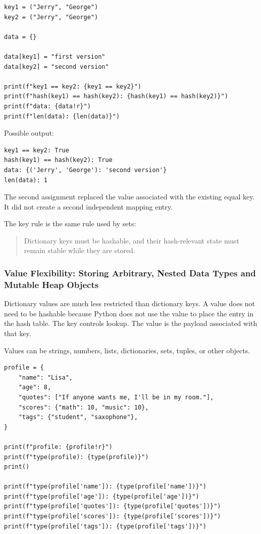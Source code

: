 \begin{verbatim}
key1 = ("Jerry", "George")
key2 = ("Jerry", "George")

data = {}

data[key1] = "first version"
data[key2] = "second version"

print(f"key1 == key2: {key1 == key2}")
print(f"hash(key1) == hash(key2): {hash(key1) == hash(key2)}")
print(f"data: {data!r}")
print(f"len(data): {len(data)}")
\end{verbatim}

Possible output:

\begin{verbatim}
key1 == key2: True
hash(key1) == hash(key2): True
data: {('Jerry', 'George'): 'second version'}
len(data): 1
\end{verbatim}

The second assignment replaced the value associated with the existing equal key. It did not create a second independent mapping entry.

The key rule is the same rule used by sets:

\begin{quote}
Dictionary keys must be hashable, and their hash-relevant state must remain stable while they are stored.
\end{quote}

\subsubsection{Value Flexibility: Storing Arbitrary, Nested Data Types and Mutable Heap Objects}

Dictionary values are much less restricted than dictionary keys. A value does not need to be hashable because Python does not use the value to place the entry in the hash table. The key controls lookup. The value is the payload associated with that key.

Values can be strings, numbers, lists, dictionaries, sets, tuples, or other objects.

\begin{verbatim}
profile = {
    "name": "Lisa",
    "age": 8,
    "quotes": ["If anyone wants me, I'll be in my room."],
    "scores": {"math": 10, "music": 10},
    "tags": {"student", "saxophone"},
}

print(f"profile: {profile!r}")
print(f"type(profile): {type(profile)}")
print()

print(f"type(profile['name']): {type(profile['name'])}")
print(f"type(profile['age']): {type(profile['age'])}")
print(f"type(profile['quotes']): {type(profile['quotes'])}")
print(f"type(profile['scores']): {type(profile['scores'])}")
print(f"type(profile['tags']): {type(profile['tags'])}")
\end{verbatim}

